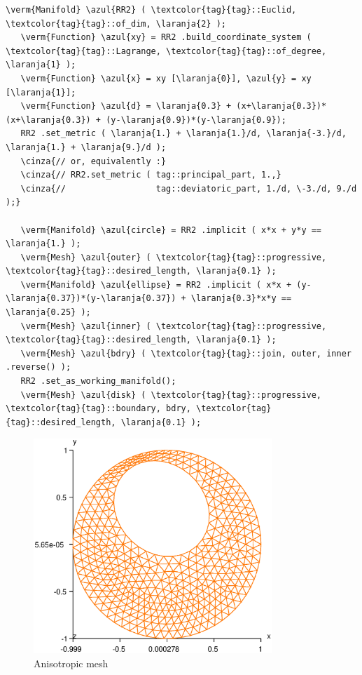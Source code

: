 \begin{Verbatim}[commandchars=\\\{\},formatcom=\small\tt,frame=single,
   label=code not working,rulecolor=\color{coment},
   baselinestretch=0.94,framesep=2mm                                  ]
   \verm{Manifold} \azul{RR2} ( \textcolor{tag}{tag}::Euclid, \textcolor{tag}{tag}::of_dim, \laranja{2} );
   \verm{Function} \azul{xy} = RR2 .build_coordinate_system ( \textcolor{tag}{tag}::Lagrange, \textcolor{tag}{tag}::of_degree, \laranja{1} );
   \verm{Function} \azul{x} = xy [\laranja{0}], \azul{y} = xy [\laranja{1}];
   \verm{Function} \azul{d} = \laranja{0.3} + (x+\laranja{0.3})*(x+\laranja{0.3}) + (y-\laranja{0.9})*(y-\laranja{0.9});
   RR2 .set_metric ( \laranja{1.} + \laranja{1.}/d, \laranja{-3.}/d, \laranja{1.} + \laranja{9.}/d );
   \cinza{// or, equivalently :}
   \cinza{// RR2.set_metric ( tag::principal_part, 1.,}
   \cinza{//                  tag::deviatoric_part, 1./d, \-3./d, 9./d );}

   \verm{Manifold} \azul{circle} = RR2 .implicit ( x*x + y*y == \laranja{1.} );
   \verm{Mesh} \azul{outer} ( \textcolor{tag}{tag}::progressive, \textcolor{tag}{tag}::desired_length, \laranja{0.1} );
   \verm{Manifold} \azul{ellipse} = RR2 .implicit ( x*x + (y-\laranja{0.37})*(y-\laranja{0.37}) + \laranja{0.3}*x*y == \laranja{0.25} );
   \verm{Mesh} \azul{inner} ( \textcolor{tag}{tag}::progressive, \textcolor{tag}{tag}::desired_length, \laranja{0.1} );
   \verm{Mesh} \azul{bdry} ( \textcolor{tag}{tag}::join, outer, inner .reverse() );
   RR2 .set_as_working_manifold();
   \verm{Mesh} \azul{disk} ( \textcolor{tag}{tag}::progressive, \textcolor{tag}{tag}::boundary, bdry, \textcolor{tag}{tag}::desired_length, \laranja{0.1} );
\end{Verbatim}

\begin{figure} \centering
 \includegraphics[width=90mm]{disk-anisotrop}
  \caption{Anisotropic mesh}
  \label{\numb section 3.\numb fig 11}
\end{figure}

